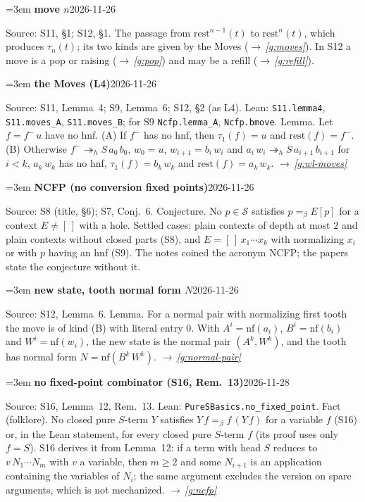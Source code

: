 \documentclass[11pt]{amsart}
\makeatletter
\newcommand{\Ter}{\mathcal S}
\newcommand{\hred}{\twoheadrightarrow_h}
\newcommand{\conv}{=_\beta}
\newcommand{\rest}{\mathrm{rest}}
\newcommand{\nf}{\mathrm{nf}}
\newcounter{sense}
\newenvironment{entry}[3]{%
  \par\addvspace{\medskipamount}\noindent\phantomsection
  \def\@currentlabel{#2}\label{#1}\setcounter{sense}{0}\raggedright\emergencystretch=3em%
  \textbf{#2}\hfill{\footnotesize\textsf{#3}}\par\nopagebreak\noindent\ignorespaces}%
  {\par}
\newcommand{\src}[1]{\textsf{Source:} #1.\enskip}
\newcommand{\lean}[1]{\textsf{Lean:} #1.\enskip}
\renewcommand{\see}[1]{$\rightarrow$\,\emph{\ref{#1}}}
\makeatother
\begin{document}
\begin{entry}{g:move}{move $n$}{2026-11-26}
\src{S11, \S1; S12, \S1}
The passage from $\rest^{n-1}(t)$ to $\rest^n(t)$, which produces $\tau_n(t)$; its two kinds are given
by the Moves (\see{g:moves}). In S12 a move is a pop or raising (\see{g:pop}) and may be a refill
(\see{g:refill}).
\end{entry}

\begin{entry}{g:moves}{the Moves (L4)}{2026-11-26}
\src{S11, Lemma~4; S9, Lemma~6; S12, \S2 (as L4)}
\lean{\texttt{S11.lemma4}, \texttt{S11.moves\_A}, \texttt{S11.moves\_B}; for S9 \texttt{Ncfp.lemma\_A},
\texttt{Ncfp.bmove}}
Lemma. Let $f=f^-\,u$ have no hnf. (A) If $f^-$ has no hnf, then $\tau_1(f)=u$ and $\rest(f)=f^-$.
(B) Otherwise $f^-\hred S\,a_0\,b_0$, $w_0=u$, $w_{i+1}=b_i\,w_i$ and $a_i\,w_i\hred
S\,a_{i+1}\,b_{i+1}$ for $i<k$, $a_k\,w_k$ has no hnf, $\tau_1(f)=b_k\,w_k$ and $\rest(f)=a_k\,w_k$.
\see{g:wl-moves}
\end{entry}

\begin{entry}{g:ncfp}{NCFP (no conversion fixed points)}{2026-11-26}
\src{S8 (title, \S6); S7, Conj.~6}
Conjecture. No $p\in\Ter$ satisfies $p\conv E[p]$ for a context $E\ne[\,]$ with a hole. Settled cases:
plain contexts of depth at most $2$ and plain contexts without closed parts (S8), and
$E=[\,]\,x_1\cdots x_k$ with normalizing $x_i$ or with $p$ having an hnf (S9). The notes coined the
acronym NCFP; the papers state the conjecture without it.
\end{entry}

\begin{entry}{g:new-state}{new state, tooth normal form $N$}{2026-11-26}
\src{S12, Lemma~6}
Lemma. For a normal pair with normalizing first tooth the move is of kind (B) with literal entry
$0$. With $A^i=\nf(a_i)$, $B^i=\nf(b_i)$ and $W^i=\nf(w_i)$, the new state is the normal pair
$(A^k,W^k)$, and the tooth has normal form $N=\nf(B^k\,W^k)$. \see{g:normal-pair}
\end{entry}

\begin{entry}{g:no-fpc}{no fixed-point combinator (S16, Rem.~13)}{2026-11-28}
\src{S16, Lemma~12, Rem.~13}
\lean{\texttt{PureSBasics.no\_fixed\_point}}
Fact (folklore). No closed pure $S$-term $Y$ satisfies $Y\,f\conv f\,(Y\,f)$ for a variable $f$ (S16) or, in
the Lean statement, for every closed pure $S$-term $f$ (its proof uses only $f=S$). S16 derives it from Lemma~12: if
a term with head $S$ reduces to $v\,N_1\cdots N_m$ with $v$ a variable, then $m\ge2$ and some $N_{i+1}$ is
an application containing the variables of $N_i$; the same argument excludes the version on spare
arguments, which is not mechanized. \see{g:ncfp}
\end{entry}
\end{document}

